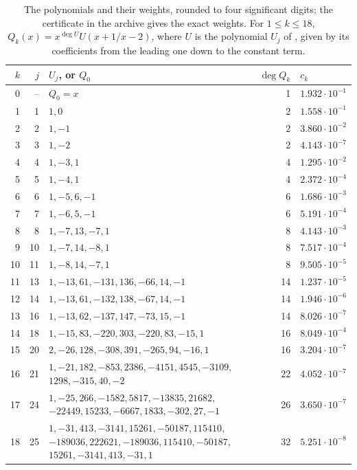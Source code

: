 \documentclass[11pt]{amsart}
\theoremstyle{remark}
\numberwithin{equation}{section}
\begin{document}
\begin{table}[ht]
\centering
\caption{The polynomials and their weights, rounded to four significant digits; the certificate in the archive gives the exact weights. For $1\le k\le18$, $Q_k(x)=x^{\deg U}U(x+1/x-2)$, where $U$ is the polynomial $U_j$ of \cite[Table~1]{Fla15}, given by its coefficients from the leading one down to the constant term.}\label{tab:polys}
\small
\begin{tabular}{@{}rrp{}rl@{}}
\toprule
$k$ & $j$ & $U_j$, or $Q_0$ & $\deg Q_k$ & $c_k$\\
\midrule
0 & -- & $Q_0=x$ & 1 & $1.932\cdot10^{-1}$\\
1 & 1 & $1,0$ & 2 & $1.558\cdot10^{-1}$\\
2 & 2 & $1,-1$ & 2 & $3.860\cdot10^{-2}$\\
3 & 3 & $1,-2$ & 2 & $4.143\cdot10^{-7}$\\
4 & 4 & $1,-3,1$ & 4 & $1.295\cdot10^{-2}$\\
5 & 5 & $1,-4,1$ & 4 & $2.372\cdot10^{-4}$\\
6 & 6 & $1,-5,6,-1$ & 6 & $1.686\cdot10^{-3}$\\
7 & 7 & $1,-6,5,-1$ & 6 & $5.191\cdot10^{-4}$\\
8 & 8 & $1,-7,13,-7,1$ & 8 & $4.143\cdot10^{-3}$\\
9 & 10 & $1,-7,14,-8,1$ & 8 & $7.517\cdot10^{-4}$\\
10 & 11 & $1,-8,14,-7,1$ & 8 & $9.505\cdot10^{-5}$\\
11 & 13 & $1,-13,61,-131,136,-66,14,-1$ & 14 & $1.237\cdot10^{-5}$\\
12 & 14 & $1,-13,61,-132,138,-67,14,-1$ & 14 & $1.946\cdot10^{-6}$\\
13 & 16 & $1,-13,62,-137,147,-73,15,-1$ & 14 & $8.026\cdot10^{-7}$\\
14 & 18 & $1,-15,83,-220,303,-220,83,-15,1$ & 16 & $8.049\cdot10^{-4}$\\
15 & 20 & $2,-26,128,-308,391,-265,94,-16,1$ & 16 & $3.204\cdot10^{-7}$\\
16 & 21 & $1,-21,182,-853,2386,-4151,4545,-3109,$ $1298,-315,40,-2$ & 22 & $4.052\cdot10^{-7}$\\
17 & 24 & $1,-25,266,-1582,5817,-13835,21682,$ $-22449,15233,-6667,1833,-302,27,-1$ & 26 & $3.650\cdot10^{-7}$\\
18 & 25 & $1,-31,413,-3141,15261,-50187,115410,$ $-189036,222621,-189036,115410,-50187,$ $15261,-3141,413,-31,1$ & 32 & $5.251\cdot10^{-8}$\\
\bottomrule
\end{tabular}
\end{table}
\end{document}
